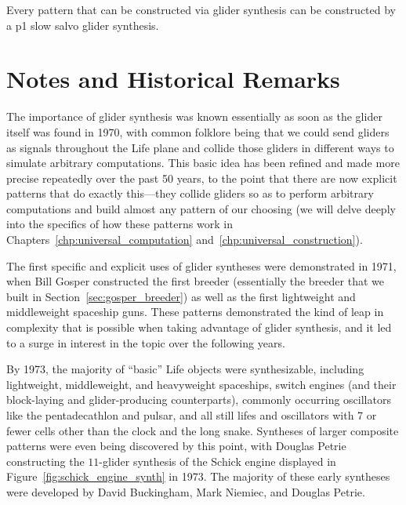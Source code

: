 \begin{theorem}\label{thm:p1_slow_salvo}
	Every pattern that can be constructed via glider synthesis can be constructed by a p1 slow salvo glider synthesis.
\end{theorem}


\section{Notes and Historical Remarks}\label{sec:synthesis_notes}

The importance of glider synthesis was known essentially as soon as the glider itself was found in 1970, with common folklore being that we could send gliders as signals throughout the Life plane and collide those gliders in different ways to simulate arbitrary computations. This basic idea has been refined and made more precise repeatedly over the past 50 years, to the point that there are now explicit patterns that do exactly this---they collide gliders so as to perform arbitrary computations and build almost any pattern of our choosing (we will delve deeply into the specifics of how these patterns work in Chapters~\ref{chp:universal_computation} and~\ref{chp:universal_construction}).

The first specific and explicit uses of glider syntheses were demonstrated in 1971, when Bill Gosper constructed the first breeder (essentially the breeder that we built in Section~\ref{sec:gosper_breeder}) as well as the first lightweight and middleweight spaceship guns. These patterns demonstrated the kind of leap in complexity that is possible when taking advantage of glider synthesis, and it led to a surge in interest in the topic over the following years.

By 1973, the majority of ``basic'' Life objects were synthesizable, including lightweight, middleweight, and heavyweight spaceships, switch engines (and their block-laying and glider-producing counterparts), commonly occurring oscillators like the pentadecathlon and pulsar, and all still lifes and oscillators with 7 or fewer cells other than the clock and the long snake. Syntheses of larger composite patterns were even being discovered by this point, with Douglas Petrie constructing the $11$-glider synthesis of the Schick engine displayed in Figure~\ref{fig:schick_engine_synth} in 1973. The majority of these early syntheses were developed by David Buckingham, Mark Niemiec, and Douglas Petrie.

